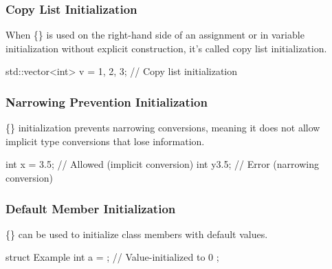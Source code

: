 \documentclass{report}
\begin{document}
    \bigbreak \noindent 
    \subsubsection{Copy List Initialization}
    \bigbreak \noindent 
    When \{\} is used on the right-hand side of an assignment or in variable initialization without explicit construction, it's called copy list initialization.
    \bigbreak \noindent 
    \begin{cppcode}
    std::vector<int> v = {1, 2, 3}; // Copy list initialization
    \end{cppcode}
    
    \bigbreak \noindent 
    \subsubsection{Narrowing Prevention Initialization}
    \bigbreak \noindent 
    \{\} initialization prevents narrowing conversions, meaning it does not allow implicit type conversions that lose information.
    \bigbreak \noindent 
    \begin{cppcode}
        int x = 3.5;  // Allowed (implicit conversion)
        int y{3.5};   // Error (narrowing conversion)
    \end{cppcode}


    \bigbreak \noindent 
    \subsubsection{ Default Member Initialization}
    \bigbreak \noindent 
    \{\} can be used to initialize class members with default values.
    \bigbreak \noindent 
    \begin{cppcode}
        struct Example {
            int a = {};  // Value-initialized to 0
        };
    \end{cppcode}

    \bigbreak \noindent 
\end{document}
